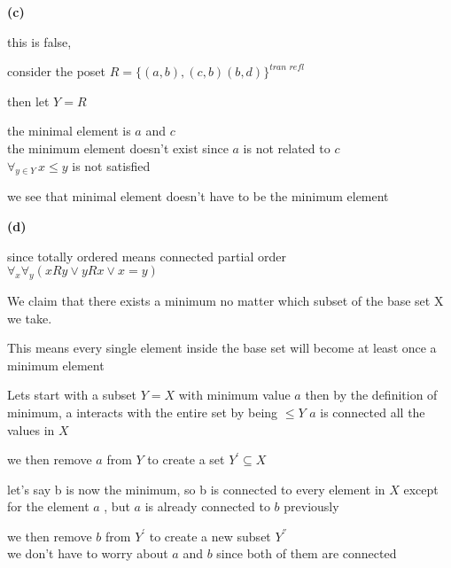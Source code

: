 \documentclass[12pts,A4]{article}
\begin{document}
\begin{flushleft}
    \bigskip

    \textbf{(c)}

    this is false,

    consider the poset  $ R = \{ (a,b),(c,b) (b,d) \}^{tran\,\, refl} $
    


    then let $ Y = R$ 
    
    the minimal element is $ a$ and $c$\\
    the minimum element doesn't exist since $a$ is not related to $c$\\
    $\forall_{y \in Y} \, x\leq y$ is not satisfied

    \bigskip
    
    we see that minimal element doesn't have to be the minimum element
    

    \bigskip
    \textbf{(d)}
    
    since totally ordered means connected partial order\\
    $ \forall_{x}\forall_{y} (xRy \vee yRx \vee x=y)$
    
    We claim that there exists a minimum no matter which subset of the base set X we take. 
    
    This means every single element inside the base set will become at least once a minimum element 
    
    Lets start with a subset $Y = X$ with minimum value $a$
    then by the definition of minimum, a interacts with the entire set by being $ \leq Y$ 
    $a$ is connected all the values in $X$

    \bigskip
    we then remove $a$ from $Y$ to create a set $Y^{'} \subseteq X$

    let's say b is now the minimum, so b is connected to every element in $X$ except for the element $a$ , but $a$ is already connected to $b$ previously


    \bigskip
    
    we then remove $b$ from $Y^{'}$ to create a new subset $Y^{''}$\\
    we don't have to worry about $a$ and $b$ since both of them are connected\\


\end{flushleft}
\end{document}
